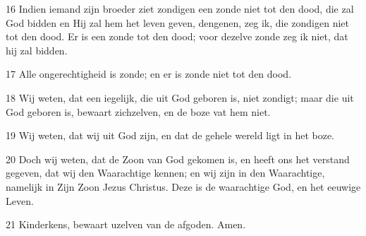 \par 16 Indien iemand zijn broeder ziet zondigen een zonde niet tot den dood, die zal God bidden en Hij zal hem het leven geven, dengenen, zeg ik, die zondigen niet tot den dood. Er is een zonde tot den dood; voor dezelve zonde zeg ik niet, dat hij zal bidden.
\par 17 Alle ongerechtigheid is zonde; en er is zonde niet tot den dood.
\par 18 Wij weten, dat een iegelijk, die uit God geboren is, niet zondigt; maar die uit God geboren is, bewaart zichzelven, en de boze vat hem niet.
\par 19 Wij weten, dat wij uit God zijn, en dat de gehele wereld ligt in het boze.
\par 20 Doch wij weten, dat de Zoon van God gekomen is, en heeft ons het verstand gegeven, dat wij den Waarachtige kennen; en wij zijn in den Waarachtige, namelijk in Zijn Zoon Jezus Christus. Deze is de waarachtige God, en het eeuwige Leven.
\par 21 Kinderkens, bewaart uzelven van de afgoden. Amen.




